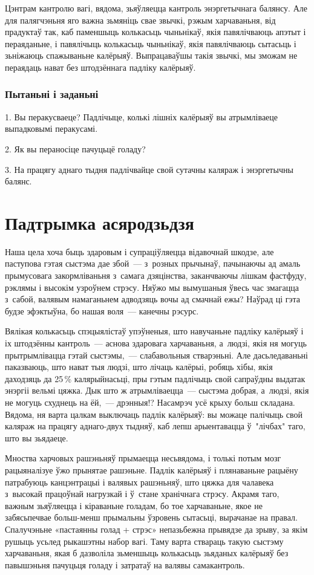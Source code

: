 Цэнтрам кантролю вагі, вядома, зьяўляецца кантроль энэргетычнага балянсу. Але для палягчэньня яго важна зьмяніць свае звычкі, рэжым харчаваньня, від прадуктаў так, каб паменшыць колькасьць чыньнікаў, якія павялічваюць апэтыт і пераяданьне, і павялічыць колькасьць чыньнікаў, якія павялічваюць сытасьць і зьніжаюць спажываньне калёрыяў. Выпрацаваўшы такія звычкі, мы зможам не пераядаць нават без штодзённага падліку калёрыяў.

\subsubsection{Пытаньні і заданьні}

1. Вы перакусваеце? Падлічыце, колькі лішніх калёрыяў вы атрымліваеце выпадковымі перакусамі.

2. Як вы пераносіце пачуцьцё голаду?

3. На працягу аднаго тыдня падлічвайце свой сутачны каляраж і энэргетычны балянс.


\section{Падтрымка асяродзьдзя}

Наша цела хоча быць здаровым і супраціўляецца відавочнай шкодзе, але паступова гэтая сыстэма дае збой~--- з~розных прычынаў, пачынаючы ад амаль прымусовага закормліваньня з~самага дзяцінства, заканчваючы лішкам фастфуду, рэклямы і высокім узроўнем стрэсу. Няўжо мы вымушаныя ўвесь час змагацца з~сабой, валявым намаганьнем адводзяць вочы ад смачнай ежы? Наўрад ці гэта будзе эфэктыўна, бо нашая воля~--- канечны рэсурс.

Вялікая колькасьць спэцыялістаў упэўненыя, што навучаньне падліку калёрыяў і іх штодзённы кантроль~--- аснова здаровага харчаваньня, а~людзі, якія ня могуць прытрымлівацца гэтай сыстэмы,~--- слабавольныя стварэньні. Але дасьледаваньні паказваюць, што нават тыя людзі, што лічаць калёрыі, робяць хібы, якія даходзяць да 25\,\% калярыйнасьці, пры гэтым падлічыць свой сапраўдны выдатак энэргіі вельмі цяжка. Дык што ж атрымліваецца~--- сыстэма добрая, а~людзі, якія не могуць схуднець на ёй,~--- дрэнныя!? Насамрэч усё крыху больш складана. Вядома, ня варта цалкам выключаць падлік калёрыяў: вы можаце палічыць свой каляраж на працягу аднаго-двух тыдняў, каб лепш арыентавацца ў~"лічбах" таго, што вы зьядаеце.

Мноства харчовых рашэньняў прымаецца несьвядома, і толькі потым мозг рацыяналізуе ўжо прынятае рашэньне. Падлік калёрыяў і плянаваньне рацыёну патрабуюць канцэнтрацыі і валявых рашэньняў, што цяжка для чалавека з~высокай працоўнай нагрузкай і ў~стане хранічнага стрэсу. Акрамя таго, важным зьяўляецца і кіраваньне голадам, бо тое харчаваньне, якое не забясьпечвае больш-менш прымальны ўзровень сытасьці, вырачанае на правал. Спалучэньне «пастаянны голад + стрэс» непазьбежна прывядзе да зрыву, за якім рушыць усьлед рыкашэтны набор вагі. Таму варта ствараць такую сыстэму харчаваньня, якая б дазволіла зьменшыць колькасьць зьяданых калёрыяў без павышэньня пачуцьця голаду і затратаў на валявы самакантроль.

